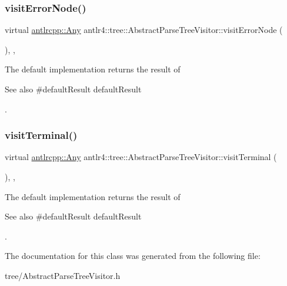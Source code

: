 \subsubsection{\texorpdfstring{visit\+Error\+Node()}{visitErrorNode()}}
{\footnotesize\ttfamily virtual \hyperlink{structantlrcpp_1_1Any}{antlrcpp\+::\+Any} antlr4\+::tree\+::\+Abstract\+Parse\+Tree\+Visitor\+::visit\+Error\+Node (\begin{DoxyParamCaption}\item[{\hyperlink{classantlr4_1_1tree_1_1ErrorNode}{Error\+Node} $\ast$}]{ }\end{DoxyParamCaption})\hspace{0.3cm}{\ttfamily [inline]}, {\ttfamily [override]}, {\ttfamily [virtual]}}

The default implementation returns the result of \begin{DoxySeeAlso}{See also}
\#default\+Result default\+Result


\end{DoxySeeAlso}
. \mbox{\label{classantlr4_1_1tree_1_1AbstractParseTreeVisitor_a6045b85607e961bf7f364b91fd50c3ef}} 
\subsubsection{\texorpdfstring{visit\+Terminal()}{visitTerminal()}}
{\footnotesize\ttfamily virtual \hyperlink{structantlrcpp_1_1Any}{antlrcpp\+::\+Any} antlr4\+::tree\+::\+Abstract\+Parse\+Tree\+Visitor\+::visit\+Terminal (\begin{DoxyParamCaption}\item[{\hyperlink{classantlr4_1_1tree_1_1TerminalNode}{Terminal\+Node} $\ast$}]{ }\end{DoxyParamCaption})\hspace{0.3cm}{\ttfamily [inline]}, {\ttfamily [override]}, {\ttfamily [virtual]}}

The default implementation returns the result of \begin{DoxySeeAlso}{See also}
\#default\+Result default\+Result


\end{DoxySeeAlso}
. 

The documentation for this class was generated from the following file\+:\begin{DoxyCompactItemize}
\item 
tree/Abstract\+Parse\+Tree\+Visitor.\+h\end{DoxyCompactItemize}
